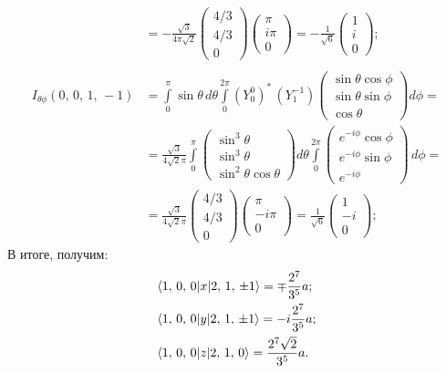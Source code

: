 \begin{align*}
  & = -\frac{\sqrt{3}}{4\pi\sqrt{2}}\begin{pmatrix} 4/3 \\  4/3 \\ 0 \end{pmatrix} \begin{pmatrix} \pi \\ i\pi \\ 0 \end{pmatrix} = -\frac{1}{\sqrt{6}}\begin{pmatrix} 1 \\  i \\ 0 \end{pmatrix}; \\
  \\
  I_{\theta\phi}(0,\,0,\,1,\,-1) &= \int\limits_{0}^{\pi}\sin\theta\,d\theta\int\limits_{0}^{2\pi}(Y^0_0)^* \, (Y^{-1}_1) \begin{pmatrix} \sin\theta\cos\phi \\ \sin\theta\sin\phi \\ \cos\theta \end{pmatrix} d\phi = \\& = \frac{\sqrt{3}}{4\sqrt{2}\pi} \int\limits_0^{\pi} \begin{pmatrix} \sin^3 \theta \\ \sin^3\theta \\ \sin^2\theta\cos\theta \end{pmatrix} d\theta \int\limits_{0}^{2\pi} \begin{pmatrix} e^{-i\phi}\cos\phi \\ e^{-i\phi}\sin\phi \\ e^{-i\phi} \end{pmatrix} \, d\phi = \\& = \frac{\sqrt{3}}{4\sqrt{2}\pi} \begin{pmatrix} 4/3 \\ 4/3 \\ 0 \end{pmatrix} \begin{pmatrix} \pi \\ -i\pi \\ 0 \end{pmatrix} = \frac{1}{\sqrt{6}} \begin{pmatrix} 1 \\ -i \\ 0 \end{pmatrix};
\end{align*}
В итоге, получим:
\begin{align*}
  \langle1,\, 0,\, 0\rvert&x\lvert2,\, 1,\, \pm 1\rangle = \mp \frac{2^7}{3^5}a;\\
  \langle1,\, 0,\, 0\rvert&y\lvert2,\, 1,\, \pm 1\rangle = - i\frac{2^7}{3^5}a;\\
  \langle1,\, 0,\, 0\rvert&z\lvert2,\, 1,\,  0\rangle = \frac{2^7 \sqrt{2}}{3^5}a.
\end{align*}
\qedsq